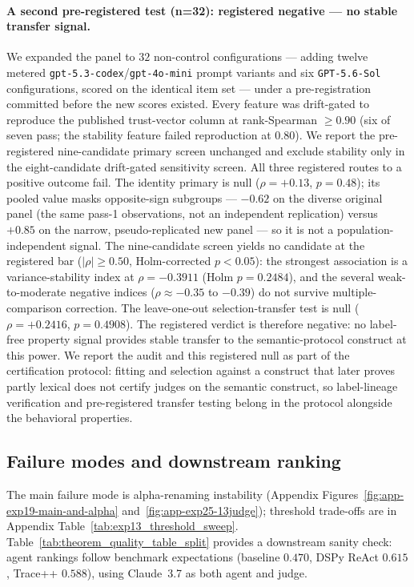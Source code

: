 \documentclass{article}
\begin{document}
\paragraph{A second pre-registered test (n{=}32): registered negative --- no stable transfer signal.}
We expanded the panel to \(32\) non-control configurations --- adding twelve metered \texttt{gpt-5.3-codex}/\texttt{gpt-4o-mini} prompt variants and six \texttt{GPT-5.6-Sol} configurations, scored on the identical item set --- under a pre-registration committed before the new scores existed.
Every feature was drift-gated to reproduce the published trust-vector column at rank-Spearman \(\ge 0.90\) (six of seven pass; the stability feature failed reproduction at \(0.80\)). We report the pre-registered nine-candidate primary screen unchanged and exclude stability only in the eight-candidate drift-gated sensitivity screen.
All three registered routes to a positive outcome fail.
The identity primary is null (\(\rho=+0.13\), \(p=0.48\)); its pooled value masks opposite-sign subgroups --- \(-0.62\) on the diverse original panel (the same pass-1 observations, not an independent replication) versus \(+0.85\) on the narrow, pseudo-replicated new panel --- so it is not a population-independent signal.
The nine-candidate screen yields no candidate at the registered bar (\(|\rho|\ge 0.50\), Holm-corrected \(p<0.05\)): the strongest association is a variance-stability index at \(\rho=-0.3911\) (Holm \(p=0.2484\)), and the several weak-to-moderate negative indices (\(\rho\approx-0.35\) to \(-0.39\)) do not survive multiple-comparison correction.
The leave-one-out selection-transfer test is null (\(\rho=+0.2416\), \(p=0.4908\)).
The registered verdict is therefore negative: no label-free property signal provides stable transfer to the semantic-protocol construct at this power.
We report the audit and this registered null as part of the certification protocol: fitting and selection against a construct that later proves partly lexical does not certify judges on the semantic construct, so label-lineage verification and pre-registered transfer testing belong in the protocol alongside the behavioral properties.

\subsection{Failure modes and downstream ranking}
The main failure mode is alpha-renaming instability (Appendix Figures~\ref{fig:app-exp19-main-and-alpha} and~\ref{fig:app-exp25-13judge}); threshold trade-offs are in Appendix Table~\ref{tab:exp13_threshold_sweep}.
Table~\ref{tab:theorem_quality_table_split} provides a downstream sanity check: agent rankings follow benchmark expectations (baseline \(0.470\), DSPy ReAct \(0.615\), Trace++ \(0.588\)), using Claude~3.7 as both agent and judge.
\end{document}
